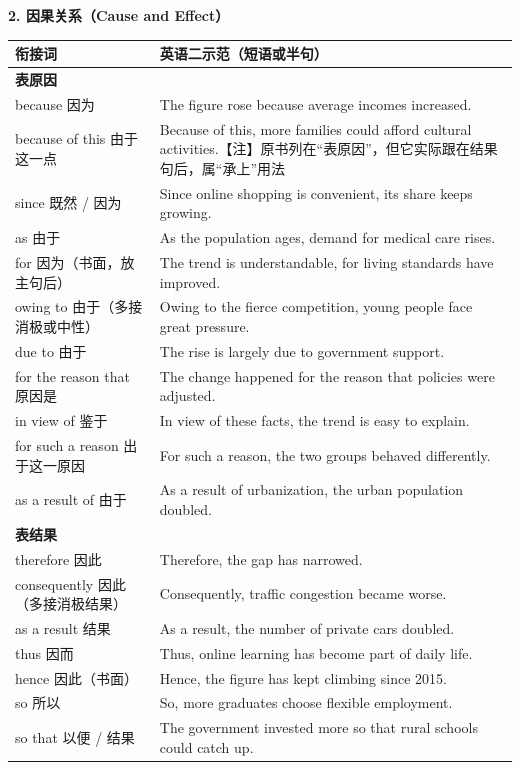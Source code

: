 \documentclass[11pt,a4paper]{ctexart}
\begin{document}
\par\addvspace{6pt}\noindent\textbf{2. 因果关系（Cause and Effect）}\par\addvspace{2pt}
\begin{longtable}{L{5.4cm}L{10.6cm}}
\toprule
\textbf{衔接词} & \textbf{英语二示范（短语或半句）} \\
\midrule
\endhead
\textbf{表原因} & \\
because 因为 & The figure rose because average incomes increased. \\
because of this 由于这一点 & Because of this, more families could afford cultural activities.【注】原书列在“表原因”，但它实际跟在结果句后，属“承上”用法 \\
since 既然 / 因为 & Since online shopping is convenient, its share keeps growing. \\
as 由于 & As the population ages, demand for medical care rises. \\
for 因为（书面，放主句后） & The trend is understandable, for living standards have improved. \\
owing to 由于（多接消极或中性） & Owing to the fierce competition, young people face great pressure. \\
due to 由于 & The rise is largely due to government support. \\
for the reason that 原因是 & The change happened for the reason that policies were adjusted. \\
in view of 鉴于 & In view of these facts, the trend is easy to explain. \\
for such a reason 出于这一原因 & For such a reason, the two groups behaved differently. \\
as a result of 由于 & As a result of urbanization, the urban population doubled. \\
\midrule
\textbf{表结果} & \\
therefore 因此 & Therefore, the gap has narrowed. \\
consequently 因此（多接消极结果） & Consequently, traffic congestion became worse. \\
as a result 结果 & As a result, the number of private cars doubled. \\
thus 因而 & Thus, online learning has become part of daily life. \\
hence 因此（书面） & Hence, the figure has kept climbing since 2015. \\
so 所以 & So, more graduates choose flexible employment. \\
so that 以便 / 结果 & The government invested more so that rural schools could catch up. \\

\end{longtable}
\end{document}
